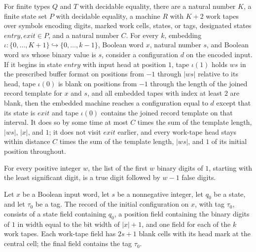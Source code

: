 \begin{theorem}
\label{Turing.rt_exists_scratchTemplateTM}
\leanok
{}
For finite types $Q$ and $T$ with decidable equality, there are a natural number $K$, a
finite state set $P$ with decidable equality, a machine $R$ with $K+2$ work tapes over
symbols encoding digits, marked work cells, states, or tags, designated states
$entry,exit\in P$, and a natural number $C$. For every $k$, embedding
$\iota:\{0,\ldots,K+1\}\hookrightarrow\{0,\ldots,k-1\}$, Boolean word $x$, natural
number $s$, and Boolean word $ws$ whose binary value is $s$, consider a configuration
$d$ on the encoded input. If it begins in state $entry$ with input head at position $1$,
tape $\iota(1)$ holds $ws$ in the prescribed buffer format on positions from $-1$
through $|ws|$ relative to its head, tape $\iota(0)$ is blank on positions from $-1$
through the length of the joined record template for $x$ and $s$, and all embedded tapes
with index at least $2$ are blank, then the embedded machine reaches a configuration
equal to $d$ except that its state is $exit$ and tape $\iota(0)$ contains the joined
record template on that interval. It does so by some time at most $C$ times the sum of
the template length, $|ws|$, $|x|$, and $1$; it does not visit $exit$ earlier, and every
work-tape head stays within distance $C$ times the sum of the template length, $|ws|$,
and $1$ of its initial position throughout.
\end{theorem}

\begin{theorem}
\label{Turing.rt_binDigits_one}
\leanok
{}
For every positive integer $w$, the list of the first $w$ binary digits of $1$, starting
with the least significant digit, is a true digit followed by $w-1$ false digits.
\end{theorem}

\begin{theorem}
\label{Turing.rt_initRecord_fields}
\leanok
{}
Let $x$ be a Boolean input word, let $s$ be a nonnegative integer, let $q_0$ be a state,
and let $\tau_0$ be a tag. The record of the initial configuration on $x$, with tag
$\tau_0$, consists of a state field containing $q_0$, a position field containing the
binary digits of $1$ in width equal to the bit width of $|x|+1$, and one field for each
of the $k$ work tapes. Each work-tape field has $2s+1$ blank cells with its head mark at
the central cell; the final field contains the tag $\tau_0$.
\end{theorem}


